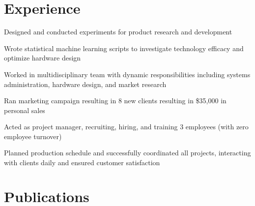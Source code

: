 \documentclass[]{deedy-resume-openfont}
\begin{document}
\begin{minipage}[t]{0.63\textwidth}


\section{Experience}
\sectionsep

\vspace{\topsep}
\begin{tightemize}
\item {Designed and conducted experiments for product research and development}
\item {Wrote statistical machine learning scripts to investigate technology efficacy and optimize hardware design}
\item {Worked in multidisciplinary team with dynamic responsibilities including systems administration, hardware design, and market research}
\end{tightemize}
\sectionsep

\begin{tightemize}
\item {Ran marketing campaign resulting in 8 new clients resulting in \$35,000 in personal sales}
\item {Acted as project manager, recruiting, hiring, and training 3 employees (with zero employee turnover)}
\item {Planned production schedule and successfully coordinated all projects, interacting with clients daily and ensured customer satisfaction}
\end{tightemize}
\sectionsep


\section{Publications}
\renewcommand\refname{\vspace{-10mm}} %


\nocite{*}

\end{minipage}
\end{document}
